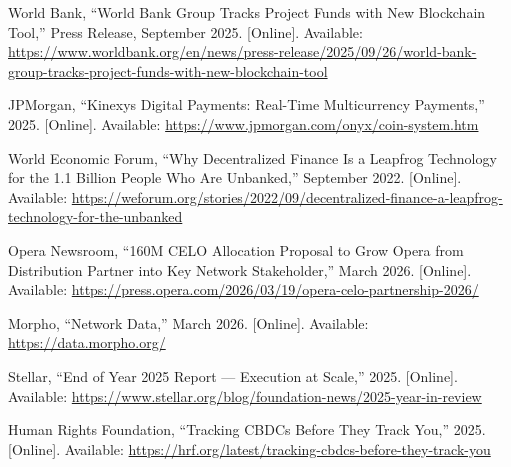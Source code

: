 \documentclass[12pt,a4paper]{report}
\begin{document}
{\begin{enumerate}[label={[\arabic*]}]
\item World Bank, ``World Bank Group Tracks Project Funds with New Blockchain Tool,'' Press Release, September 2025. [Online]. Available: \url{https://www.worldbank.org/en/news/press-release/2025/09/26/world-bank-group-tracks-project-funds-with-new-blockchain-tool}

\item JPMorgan, ``Kinexys Digital Payments: Real-Time Multicurrency Payments,'' 2025. [Online]. Available: \url{https://www.jpmorgan.com/onyx/coin-system.htm}

\item World Economic Forum, ``Why Decentralized Finance Is a Leapfrog Technology for the 1.1 Billion People Who Are Unbanked,'' September 2022. [Online]. Available: \url{https://weforum.org/stories/2022/09/decentralized-finance-a-leapfrog-technology-for-the-unbanked}

\item Opera Newsroom, ``160M CELO Allocation Proposal to Grow Opera from Distribution Partner into Key Network Stakeholder,'' March 2026. [Online]. Available: \url{https://press.opera.com/2026/03/19/opera-celo-partnership-2026/}

\item Morpho, ``Network Data,'' March 2026. [Online]. Available: \url{https://data.morpho.org/}

\item Stellar, ``End of Year 2025 Report --- Execution at Scale,'' 2025. [Online]. Available: \url{https://www.stellar.org/blog/foundation-news/2025-year-in-review}

\item Human Rights Foundation, ``Tracking CBDCs Before They Track You,'' 2025. [Online]. Available: \url{https://hrf.org/latest/tracking-cbdcs-before-they-track-you}
\end{enumerate}
}
\end{document}
